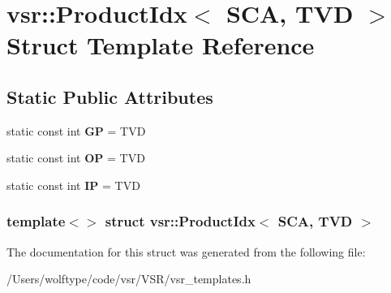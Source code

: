 \hypertarget{structvsr_1_1_product_idx_3_01_s_c_a_00_01_t_v_d_01_4}{\section{vsr\-:\-:Product\-Idx$<$ S\-C\-A, T\-V\-D $>$ Struct Template Reference}
\label{structvsr_1_1_product_idx_3_01_s_c_a_00_01_t_v_d_01_4}
}
\subsection*{Static Public Attributes}
\begin{DoxyCompactItemize}
\item 
\hypertarget{structvsr_1_1_product_idx_3_01_s_c_a_00_01_t_v_d_01_4_ab705685a9def48e4401c0cd809a5b0a7}{static const int {\bfseries G\-P} = T\-V\-D}\label{structvsr_1_1_product_idx_3_01_s_c_a_00_01_t_v_d_01_4_ab705685a9def48e4401c0cd809a5b0a7}

\item 
\hypertarget{structvsr_1_1_product_idx_3_01_s_c_a_00_01_t_v_d_01_4_a4dfa9c00f7bdf3c406efeb598963cba9}{static const int {\bfseries O\-P} = T\-V\-D}\label{structvsr_1_1_product_idx_3_01_s_c_a_00_01_t_v_d_01_4_a4dfa9c00f7bdf3c406efeb598963cba9}

\item 
\hypertarget{structvsr_1_1_product_idx_3_01_s_c_a_00_01_t_v_d_01_4_abdc02d90871181641734fb92a01c43c9}{static const int {\bfseries I\-P} = T\-V\-D}\label{structvsr_1_1_product_idx_3_01_s_c_a_00_01_t_v_d_01_4_abdc02d90871181641734fb92a01c43c9}

\end{DoxyCompactItemize}
\subsubsection*{template$<$$>$ struct vsr\-::\-Product\-Idx$<$ S\-C\-A, T\-V\-D $>$}



The documentation for this struct was generated from the following file\-:\begin{DoxyCompactItemize}
\item 
/\-Users/wolftype/code/vsr/\-V\-S\-R/vsr\-\_\-templates.\-h\end{DoxyCompactItemize}
